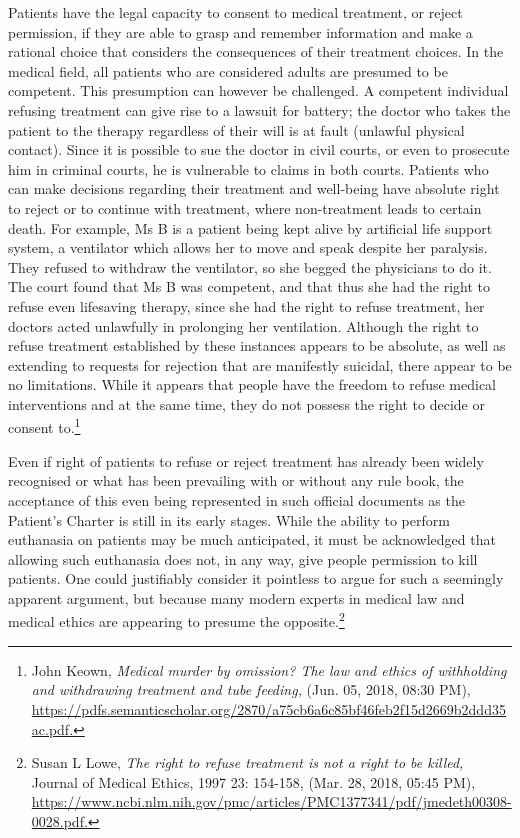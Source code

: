 \begin{multicols}{2}
\noi
Patients have the legal capacity to consent to medical treatment, or reject permission, if they
are able to grasp and remember information and make a rational choice that considers the
consequences of their treatment choices. In the medical field, all patients who are considered
adults are presumed to be competent. This presumption can however be challenged. A
competent individual refusing treatment can give rise to a lawsuit for battery; the doctor who
takes the patient to the therapy regardless of their will is at fault (unlawful physical contact).
Since it is possible to sue the doctor in civil courts, or even to prosecute him in criminal
courts, he is vulnerable to claims in both courts. Patients who can make decisions regarding
their treatment and well-being have absolute right to reject or to continue with treatment,
where non-treatment leads to certain death. For example, Ms B is a patient being kept alive
by artificial life support system, a ventilator which allows her to move and speak despite her
paralysis. They refused to withdraw the ventilator, so she begged the physicians to do it. The
court found that Ms B was competent, and that thus she had the right to refuse even lifesaving therapy, since she had the right to refuse treatment, her doctors acted unlawfully in
prolonging her ventilation. Although the right to refuse treatment established by these
instances appears to be absolute, as well as extending to requests for rejection that are
manifestly suicidal, there appear to be no limitations. While it appears that people have the
freedom to refuse medical interventions and at the same time, they do not possess the right to
decide or consent to.\footnote{John Keown, \textit{Medical murder by omission? The law and ethics of withholding and withdrawing treatment and tube feeding,} (Jun. 05, 2018, 08:30 PM),\\  \url{https://pdfs.semanticscholar.org/2870/a75cb6a6c85bf46feb2f15d2669b2ddd35ac.pdf.}}


\noi
Even if right of patients to refuse or reject treatment has already been widely recognised or
what has been prevailing with or without any rule book, the acceptance of this even being
represented in such official documents as the Patient's Charter is still in its early stages.
While the ability to perform euthanasia on patients may be much anticipated, it must be
acknowledged that allowing such euthanasia does not, in any way, give people permission to
kill patients. One could justifiably consider it pointless to argue for such a seemingly apparent argument, but because many modern experts in medical law and medical ethics are
appearing to presume the opposite.\footnote{Susan L Lowe, \textit{The right to refuse treatment is not a right to be killed,} Journal of Medical Ethics, 1997 23: 154-158, (Mar. 28, 2018, 05:45 PM),  \url{https://www.ncbi.nlm.nih.gov/pmc/articles/PMC1377341/pdf/jmedeth00308-0028.pdf.}}


\end{multicols}
